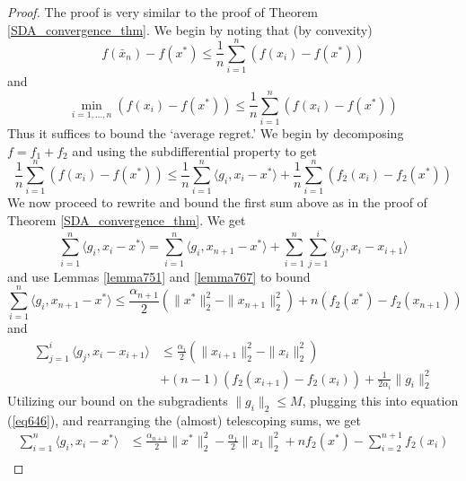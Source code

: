 \begin{proof}
 The proof is very similar to the proof of Theorem \ref{SDA_convergence_thm}. We begin by noting that (by convexity)
 \begin{equation}
  f(\bar{x}_n) - f(x^*) \leq \frac{1}{n}\displaystyle\sum_{i = 1}^n (f(x_i) - f(x^*))
 \end{equation}
 and
 \begin{equation}
  \min_{i = 1,...,n} (f(x_i) - f(x^*)) \leq \frac{1}{n}\displaystyle\sum_{i = 1}^n (f(x_i) - f(x^*))
 \end{equation}
 Thus it suffices to bound the `average regret.' We begin by decomposing $f = f_1 + f_2$ and using the subdifferential property to get
 \begin{equation}\label{eq808}
  \frac{1}{n}\displaystyle\sum_{i = 1}^n (f(x_i) - f(x^*)) \leq 
  \frac{1}{n}\displaystyle\sum_{i = 1}^n \langle g_i, x_i - x^*\rangle + \frac{1}{n}\displaystyle\sum_{i = 1}^n (f_2(x_i) - f_2(x^*))
 \end{equation}
We now proceed to rewrite and bound the first sum above as in the proof of Theorem \ref{SDA_convergence_thm}. We get
\begin{equation}
 \displaystyle\sum_{i = 1}^n \langle g_i, x_i - x^*\rangle = 
  \displaystyle\sum_{i = 1}^n \langle g_i, x_{n+1} - x^*\rangle + \displaystyle\sum_{i = 1}^n \displaystyle\sum_{j = 1}^i\langle g_j, x_i - x_{i+1}\rangle
\end{equation}
and use Lemmas \ref{lemma751} and \ref{lemma767} to bound
\begin{equation}
 \displaystyle\sum_{i = 1}^n \langle g_i, x_{n+1} - x^*\rangle \leq \frac{\alpha_{n+1}}{2}(\|x^*\|_2^2 - \|x_{n+1}\|_2^2) + n(f_2(x^*) - f_2(x_{n+1}))
\end{equation}
and
 \begin{align}
  \displaystyle\sum_{j = 1}^i\langle g_j, x_i - x_{i+1}\rangle &\leq \frac{\alpha_{i}}{2}(\|x_{i+1}\|_2^2 - \|x_i\|_2^2) \\
  &+ (n-1)(f_2(x_{i+1}) - f_2(x_i)) + \frac{1}{2\alpha_{i}} \|g_i\|_2^2
 \end{align}
 Utilizing our bound on the subgradients $\|g_i\|_2\leq M$, plugging this into equation (\ref{eq646}), and rearranging
 the (almost) telescoping sums, we get
 \begin{align}
  \displaystyle\sum_{i = 1}^n \langle g_i, x_i - x^*\rangle &\leq \frac{\alpha_{n+1}}{2}\|x^*\|_2^2 - \frac{\alpha_1}{2}\|x_1\|_2^2 + nf_2(x^*) - \displaystyle\sum_{i = 2}^{n+1} f_2(x_i) \\

\end{align}
\end{proof}
